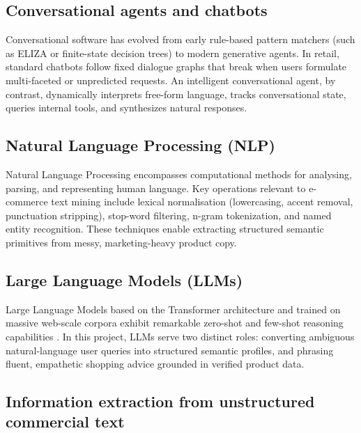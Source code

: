 \subsection{Conversational agents and chatbots}

Conversational software has evolved from early rule-based pattern matchers (such as ELIZA or finite-state decision trees) to modern generative agents. In retail, standard chatbots follow fixed dialogue graphs that break when users formulate multi-faceted or unpredicted requests. An intelligent conversational agent, by contrast, dynamically interprets free-form language, tracks conversational state, queries internal tools, and synthesizes natural responses.

\subsection{Natural Language Processing (NLP)}

Natural Language Processing encompasses computational methods for analysing, parsing, and representing human language. Key operations relevant to e-commerce text mining include lexical normalisation (lowercasing, accent removal, punctuation stripping), stop-word filtering, n-gram tokenization, and named entity recognition. These techniques enable extracting structured semantic primitives from messy, marketing-heavy product copy.

\subsection{Large Language Models (LLMs)}

Large Language Models based on the Transformer architecture \cite{vaswani2017} and trained on massive web-scale corpora exhibit remarkable zero-shot and few-shot reasoning capabilities \cite{brown2020}. In this project, LLMs serve two distinct roles: converting ambiguous natural-language user queries into structured semantic profiles, and phrasing fluent, empathetic shopping advice grounded in verified product data.

\subsection{Information extraction from unstructured commercial text}

